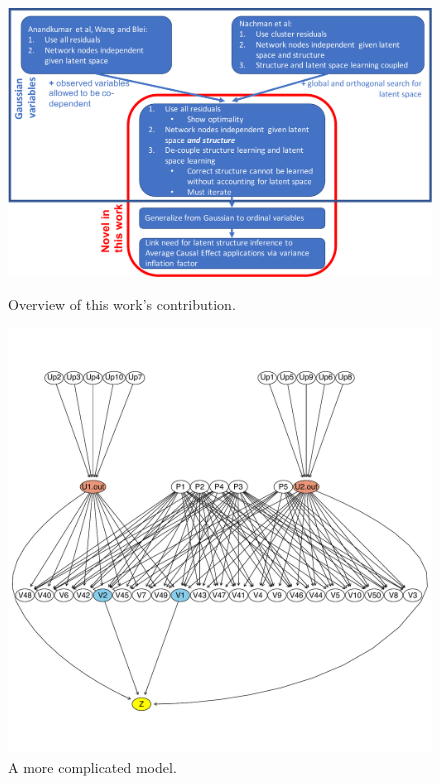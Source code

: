 \documentclass{article}
\begin{document}
\begin{figure}[ht!]
  \centering
    \begin{minipage}[t]{0.61\linewidth}
  \includegraphics[scale=0.42]{./novelty.pdf}
    \caption{\label{fig:novelty}Overview of this work's contribution.}
  \end{minipage}
  \begin{minipage}[t]{0.38\linewidth}
  \includegraphics[scale=0.31]{./complicated_model.pdf}
    \caption{\label{fig:complicated}A more complicated model.}
  \end{minipage}
\end{figure}
\end{document}

